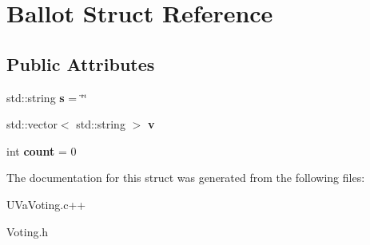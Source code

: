 \hypertarget{structBallot}{\section{\-Ballot \-Struct \-Reference}
\label{structBallot}
}
\subsection*{\-Public \-Attributes}
\begin{DoxyCompactItemize}
\item 
\hypertarget{structBallot_a370676c928732b551ea48738e1c06551}{std\-::string {\bfseries s} = \char`\"{}\char`\"{}}\label{structBallot_a370676c928732b551ea48738e1c06551}

\item 
\hypertarget{structBallot_a52ae9badb4f2271f8f5b20244a0840a7}{std\-::vector$<$ std\-::string $>$ {\bfseries v}}\label{structBallot_a52ae9badb4f2271f8f5b20244a0840a7}

\item 
\hypertarget{structBallot_a6a0f52932829e75470c5388cbde82e6b}{int {\bfseries count} = 0}\label{structBallot_a6a0f52932829e75470c5388cbde82e6b}

\end{DoxyCompactItemize}


\-The documentation for this struct was generated from the following files\-:\begin{DoxyCompactItemize}
\item 
\-U\-Va\-Voting.\-c++\item 
\-Voting.\-h\end{DoxyCompactItemize}
